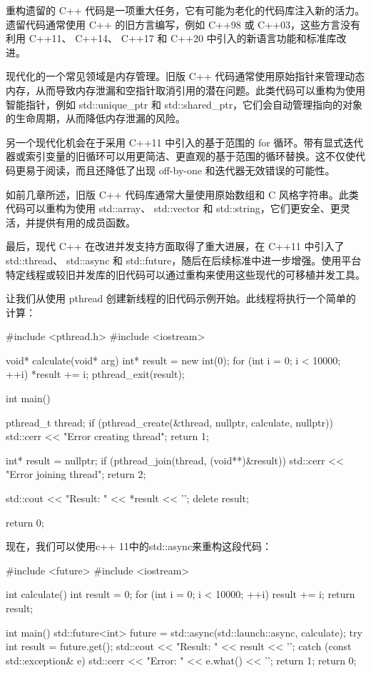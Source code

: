 重构遗留的 C++ 代码是一项重大任务，它有可能为老化的代码库注入新的活力。遗留代码通常使用 C++ 的旧方言编写，例如 C++98 或 C++03，这些方言没有利用 C++11、 C++14、 C++17 和 C++20 中引入的新语言功能和标准库改进。

现代化的一个常见领域是内存管理。旧版 C++ 代码通常使用原始指针来管理动态内存，从而导致内存泄漏和空指针取消引用的潜在问题。此类代码可以重构为使用智能指针，例如 std::unique\_ptr 和 std::shared\_ptr，它们会自动管理指向的对象的生命周期，从而降低内存泄漏的风险。

另一个现代化机会在于采用 C++11 中引入的基于范围的 for 循环。带有显式迭代器或索引变量的旧循环可以用更简洁、更直观的基于范围的循环替换。这不仅使代码更易于阅读，而且还降低了出现 off-by-one 和迭代器无效错误的可能性。

如前几章所述，旧版 C++ 代码库通常大量使用原始数组和 C 风格字符串。此类代码可以重构为使用 std::array、 std::vector 和 std::string，它们更安全、更灵活，并提供有用的成员函数。

最后，现代 C++ 在改进并发支持方面取得了重大进展，在 C++11 中引入了 std::thread、 std::async 和 std::future，随后在后续标准中进一步增强。使用平台特定线程或较旧并发库的旧代码可以通过重构来使用这些现代的可移植并发工具。

让我们从使用 pthread 创建新线程的旧代码示例开始。此线程将执行一个简单的计算：

\begin{cpp}
#include <pthread.h>
#include <iostream>

void* calculate(void* arg) {
    int* result = new int(0);
    for (int i = 0; i < 10000; ++i)
        *result += i;
    pthread_exit(result);
}

int main() {
    pthread_t thread;
    if (pthread_create(&thread, nullptr, calculate, nullptr)) {
        std::cerr << "Error creating thread\n";
        return 1;
    }

    int* result = nullptr;
    if (pthread_join(thread, (void**)&result)) {
        std::cerr << "Error joining thread\n";
        return 2;
    }

    std::cout << "Result: " << *result << '\n';
    delete result;

    return 0;
}
\end{cpp}

现在，我们可以使用c++ 11中的std::async来重构这段代码：

\begin{cpp}
#include <future>
#include <iostream>

int calculate() {
    int result = 0;
    for (int i = 0; i < 10000; ++i)
        result += i;
    return result;
}

int main() {
    std::future<int> future = std::async(std::launch::async,
    calculate);
    try {
        int result = future.get();
        std::cout << "Result: " << result << '\n';
    } catch (const std::exception& e) {
        std::cerr << "Error: " << e.what() << '\n';
        return 1;
    }
    return 0;
}
\end{cpp}

